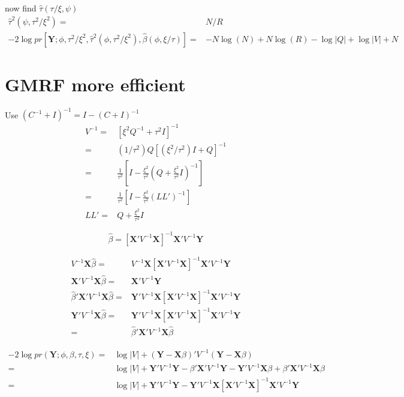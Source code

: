 \documentclass[12pt]{article}
\begin{document}
now find $\hat\tau(\tau/\xi, \psi)$
\begin{align*}
\hat\tau^2(\psi, \tau^2/\xi^2) = &  N/R \\
-2 \log pr[\mathbf{Y};\phi,\tau^2/\xi^2, \hat\tau^2(\phi, \tau^2/\xi^2), \hat\beta(\phi, \xi/\tau)] = & -N\log(N) + N \log (R)   -\log|Q| +
\log|V|+N
\end{align*}


\section*{GMRF more efficient}

Use $(C^{-1} + I)^{-1} = I-(C+I)^{-1}$ 
\begin{align*}
V^{-1} = &[\xi^2 Q^{-1} + \tau^2 I]^{-1}\\
=& (1/\tau^2) Q [(\xi^2/\tau^2)I + Q]^{-1}\\
 = & \frac{1}{\tau^2} \left[ I -  \frac{\xi^2 }{\tau^2} \left(Q +  \frac{\xi^2 }{\tau^2}  I\right)^{-1}  \right]\\
 =& \frac{1}{\tau^2} \left[ I -  \frac{\xi^2 }{\tau^2}\left(L L'  \right)^{-1}  \right]\\
L L'= &  Q +  \frac{\xi^2 }{\tau^2}  I
\end{align*}



\[
\hat\beta = [ \mathbf{X}'
 V^{-1}   \mathbf{X}]^{-1}
\mathbf{X}'V^{-1} \mathbf{Y}
\]

\begin{align*}
V^{-1} \mathbf{X} \hat\beta =& 
V^{-1} \mathbf{X} [ \mathbf{X}' V^{-1}   \mathbf{X}]^{-1}
\mathbf{X}' V^{-1} \mathbf{Y}\\
\mathbf{X}' V^{-1} \mathbf{X}  \hat\beta= &\mathbf{X}' V^{-1} \mathbf{Y}\\
\hat\beta' \mathbf{X}' V^{-1} \mathbf{X}  \hat\beta = & \mathbf{Y}'  V^{-1}   \mathbf{X}[ \mathbf{X}'
 V^{-1}   \mathbf{X}]^{-1}\mathbf{X}' V^{-1} \mathbf{Y}\\
 \mathbf{Y}' V^{-1} \mathbf{X}  \hat\beta = & \mathbf{Y}'V^{-1} \mathbf{X} [ \mathbf{X}' V^{-1}   \mathbf{X}]^{-1}
\mathbf{X}' V^{-1} \mathbf{Y}\\
= & \hat\beta' \mathbf{X}' V^{-1} \mathbf{X}  \hat\beta
\end{align*}


\begin{align*}
-2 \log pr(\mathbf{Y};\phi,\beta,\tau,\xi) =&
\log| V| + 
( \mathbf{Y} -\mathbf{X}\beta)  '
  V^{-1}
(\mathbf{Y} - \mathbf{X}\beta)\\
=&\log| V| +  \mathbf{Y}' V^{-1} \mathbf{Y} -\beta' \mathbf{X}' V^{-1} \mathbf{Y} - \mathbf{Y}' V^{-1} \mathbf{X}\beta +  \beta'\mathbf{X}'
 V^{-1}   \mathbf{X}\beta
\\
= & \log| V| +
 \mathbf{Y}' V^{-1} \mathbf{Y}  -  \mathbf{Y}'  V^{-1}   \mathbf{X}[ \mathbf{X}'
 V^{-1}   \mathbf{X}]^{-1}\mathbf{X}' V^{-1} \mathbf{Y}
\end{align*}
\end{document}
